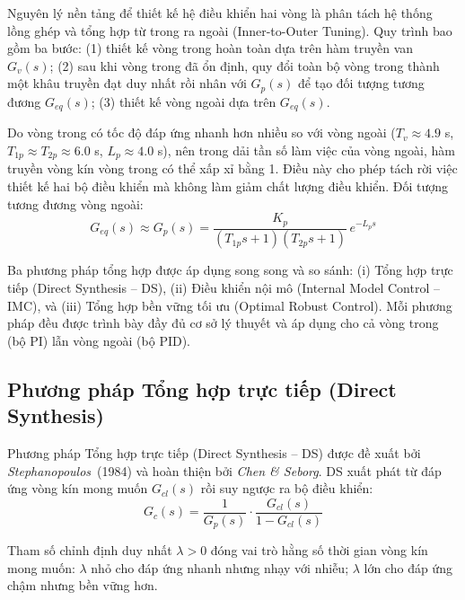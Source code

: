 \documentclass[../main.tex]{subfiles}
\begin{document}
Nguyên lý nền tảng để thiết kế hệ điều khiển hai vòng là phân tách hệ thống lồng ghép và tổng hợp từ trong ra ngoài (Inner-to-Outer Tuning). Quy trình bao gồm ba bước: (1) thiết kế vòng trong hoàn toàn dựa trên hàm truyền van $G_v(s)$; (2) sau khi vòng trong đã ổn định, quy đổi toàn bộ vòng trong thành một khâu truyền đạt duy nhất rồi nhân với $G_p(s)$ để tạo đối tượng tương đương $G_{eq}(s)$; (3) thiết kế vòng ngoài dựa trên $G_{eq}(s)$.

Do vòng trong có tốc độ đáp ứng nhanh hơn nhiều so với vòng ngoài ($T_v \approx 4.9$ s, $T_{1p} \approx T_{2p} \approx 6.0$ s, $L_p \approx 4.0$ s), nên trong dải tần số làm việc của vòng ngoài, hàm truyền vòng kín vòng trong có thể xấp xỉ bằng 1. Điều này cho phép tách rời việc thiết kế hai bộ điều khiển mà không làm giảm chất lượng điều khiển. Đối tượng tương đương vòng ngoài:
\begin{equation}
    G_{eq}(s) \approx G_p(s) = \frac{K_p}{(T_{1p} s + 1)(T_{2p} s + 1)}\, e^{-L_p s}
    \label{eq:equivalent_object}
\end{equation}

Ba phương pháp tổng hợp được áp dụng song song và so sánh: (i) Tổng hợp trực tiếp (Direct Synthesis -- DS), (ii) Điều khiển nội mô (Internal Model Control -- IMC), và (iii) Tổng hợp bền vững tối ưu (Optimal Robust Control). Mỗi phương pháp đều được trình bày đầy đủ cơ sở lý thuyết và áp dụng cho cả vòng trong (bộ PI) lẫn vòng ngoài (bộ PID).

\subsection{Phương pháp Tổng hợp trực tiếp (Direct Synthesis)}

Phương pháp Tổng hợp trực tiếp (Direct Synthesis -- DS) được đề xuất bởi \textit{Stephanopoulos}~(1984) và hoàn thiện bởi \textit{Chen \& Seborg}. DS xuất phát từ đáp ứng vòng kín mong muốn $G_{cl}(s)$ rồi suy ngược ra bộ điều khiển:
\begin{equation}
    G_c(s) = \frac{1}{G_p(s)} \cdot \frac{G_{cl}(s)}{1 - G_{cl}(s)}
    \label{eq:ds_formula}
\end{equation}

Tham số chỉnh định duy nhất $\lambda > 0$ đóng vai trò hằng số thời gian vòng kín mong muốn: $\lambda$ nhỏ cho đáp ứng nhanh nhưng nhạy với nhiễu; $\lambda$ lớn cho đáp ứng chậm nhưng bền vững hơn.
\end{document}
